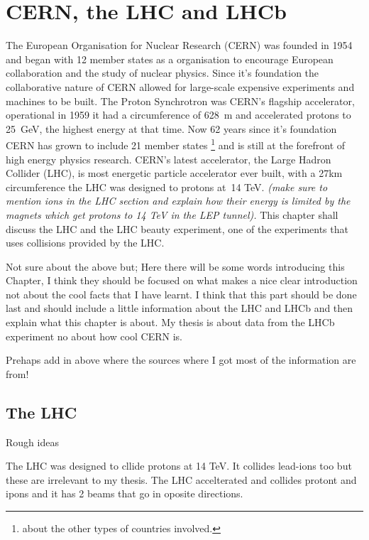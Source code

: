 \chapter{CERN, the LHC and LHCb}
\label{CERN_LHC_LHCb}


The European Organisation for Nuclear Research (CERN) was founded in 1954 and began with 12 member states as a organisation to encourage European collaboration and the study of nuclear physics. Since it's foundation the collaborative nature of CERN allowed for large-scale expensive experiments and machines to be built. The Proton Synchrotron was CERN's flagship accelerator, operational in 1959 it had a circumference of 628~m and accelerated protons to 25~GeV, the highest energy at that time. Now 62 years since it's foundation CERN has grown to include 21 member states \footnote{about the other types of countries involved.} and is still at the forefront of high energy physics research. CERN’s latest accelerator, the Large Hadron Collider (LHC), is most energetic particle accelerator ever built, with a 27km circumference the LHC was designed to protons at~14 TeV. \textit{(make sure to mention ions in the LHC section and explain how their energy is limited by the magnets which get protons to 14 TeV in the LEP tunnel). }  This chapter shall discuss the LHC and the LHC beauty experiment, one of the experiments that uses collisions provided by the LHC.

Not sure about the above but;
Here there will be some words introducing this Chapter, I think they should be focused on what makes a nice clear introduction not about the cool facts that I have learnt. I think that this part should be done last and should include a little information about the LHC and LHCb and then explain what this chapter is about. My thesis is about data from the LHCb experiment no about how cool CERN is.

Prehaps add in above where the sources where I got most of the information are from!

\section{The LHC}
\label{LHC}

Rough ideas

The LHC was designed to cllide protons at 14 TeV. It collides lead-ions too but these are irrelevant to my thesis. The LHC accelterated and collides protont and ipons and it has 2 beams that go in oposite directions.


